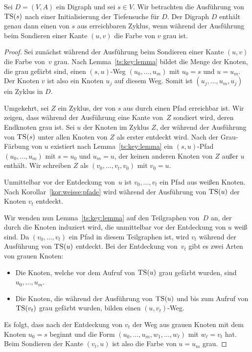 \begin{thm} \label{thm:ts:und:zyklen} 
	Sei $D=(V,A)$ ein Digraph und sei $s \in V$. Wir betrachten die Ausführung von $\mathop{\text{\textsc{TS}}}(s)$ nach einer Initialisierung der Tiefensuche für $D$. Der Digraph $D$ enthält genau dann einen von $s$ aus erreichbaren Zyklus, wenn während der Ausführung beim Sondieren einer Kante $(u,v)$ die Farbe von $v$ grau ist. 
\end{thm}
\begin{proof}	
	Sei zunächst während der Ausführung beim Sondieren einer Kante $(u,v)$ die Farbe von~$v$ grau. Nach Lemma~\ref{ts:key:lemma} bildet die Menge der Knoten, die grau gefärbt sind, einen $(s,u)$-Weg $(u_0,\ldots,u_m)$ mit $u_0=s$ und $u=u_m$. Der Knoten $v$ ist also ein Knoten $u_j$ auf diesem Weg. Somit ist $(u_j,\ldots,u_m,u_j)$ ein Zyklus in $D$.
	
\condclearpage

	Umgekehrt, sei $Z$ ein Zyklus, der von $s$ aus durch einen Pfad erreichbar ist. Wir zeigen, dass während der Ausführung eine Kante von~$Z$ sondiert wird, deren Endknoten grau ist. Sei $u$ der Knoten im Zyklus $Z$, der während der Ausführung von $\mathop{\text{\textsc{TS}}}(s)$ unter allen Knoten von $Z$ als erster entdeckt wird. Nach der Grau-Färbung von $u$ existiert nach Lemma~\ref{ts:key:lemma} ein $(s,u)$-Pfad $(u_0,\ldots,u_m)$ mit $s=u_0$ und $u_m=u$, der keinen anderen Knoten von $Z$ außer $u$ enthält. Wir schreiben $Z$ als $(v_0,\ldots,v_t,v_0)$ mit $v_0=u$.
	
\condclearpage
	
	Unmittelbar vor der Entdeckung von~$u$ ist $v_0,\ldots,v_t$ ein Pfad aus weißen Knoten. Nach Korollar~\ref{kor:weisse:pfade} wird während der Ausführung von $\mathop{\text{\textsc{TS}}}(u)$ der Knoten $v_t$ entdeckt.
	
	Wir wenden nun Lemma~\ref{ts:key:lemma} auf den Teilgraphen von~$D$ an, der durch die Knoten induziert wird, die unmittelbar vor der Entdeckung von $u$ weiß sind. Da $(v_0,\ldots,v_t)$ ein Pfad in diesem Teilgraphen ist, wird $v_t$ während der Ausführung von $\mathop{\text{\textsc{TS}}}(u)$ entdeckt. Bei der Entdeckung von~$v_t$ gibt es zwei Arten von grauen Knoten:
\begin{itemize}
 \item Die Knoten, welche vor dem Aufruf von $\mathop{\text{\textsc{TS}}}(u)$ grau gefärbt wurden, sind $u_0,\ldots,u_m$.
 \item Die Knoten, die während der Ausführung von $\mathop{\text{\textsc{TS}}}(u)$ und bis zum Aufruf von $\mathop{\text{\textsc{TS}}}(v_t)$ grau gefärbt wurden, bilden einen $(u,v_t)$-Weg.
\end{itemize}

\condclearpage

\noindent Es folgt, dass nach der Entdeckung von $v_t$ der Weg aus grauen Knoten mit dem Knoten $u_0=s$ beginnt und die Form $(u_0,\ldots,u_m, w_1,\ldots,w_\ell)$ mit $w_\ell =v_t$ hat. Beim Sondieren der Kante $(v_t,u)$ ist also die Farbe von $u=u_m$ grau. 
\end{proof}

